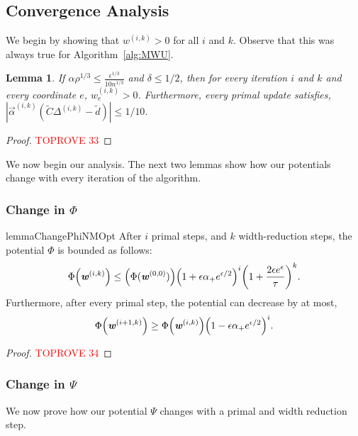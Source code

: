\documentclass[11pt]{article}
\newtheorem{lemma}[theorem]{Lemma}
\let\originalleft\left
\let\originalright\right
\renewcommand{\left}{\mathopen{}\mathclose\bgroup\originalleft}
\renewcommand{\right}{\aftergroup\egroup\originalright}
\newcommand\dd{\boldsymbol{\mathit{d}}}
\newcommand\ww{\boldsymbol{\mathit{w}}}
\newcommand\CC{\boldsymbol{\mathit{C}}}
\newcommand{\wt}{\widetilde}
\begin{document}
\subsection*{Convergence Analysis}
We begin by showing that $\ww^{(i,k)}>0$ for all $i$ and $k$. Observe that this was always true for Algorithm~\ref{alg:MWU}.



\begin{lemma}\label{lem:positiveWopt}
 If $\alpha \rho^{1/3}\leq \frac{\epsilon^{1/3}}{10 n^{1/3}}$ and $\delta \leq 1/2$, then for every iteration $i$ and $k$ and every coordinate $e$, $\ww^{(i,k)}_e > 0$. Furthermore, every primal update satisfies, $|\overrightarrow{\alpha}^{(i,k)} (\wt{\CC}\Delta^{(i,k)}-\wt{\dd})|\leq 1/10.$
\end{lemma}
\begin{proof}\textcolor{red}{TOPROVE 33}\end{proof}

We now begin our analysis. The next two lemmas show how our potentials change with every iteration of the algorithm.

\subsubsection*{Change in $\Phi$}
\begin{restatable}{lemma}{ChangePhiNMOpt}
  \label{lem:ChangePhiNMOpt}
  After $i$ primal steps, and $k$ width-reduction steps,
  the potential $\Phi$ is bounded as follows:
  \begin{align*}
\Phi\left(\ww^{(i,k)}\right) \leq \left(\Phi(\ww^{(0,0)})\right)\left(1+\epsilon\alpha_+ e^{\epsilon/2}\right)^i\left(1 + \frac{2\epsilon e^{\epsilon}}{\tau}\right)^k.
 \end{align*}
 Furthermore, after every primal step, the potential can decrease by at most,
 \[
 \Phi\left(\ww^{(i+1,k)}\right) \geq  \Phi\left(\ww^{(i,k)}\right)\left(1-\epsilon\alpha_+ e^{\epsilon/2}\right)^i.  
 \]
\end{restatable}
\begin{proof}\textcolor{red}{TOPROVE 34}\end{proof}


\subsubsection*{Change in $\Psi$}


We now prove how our potential $\Psi$ changes with a primal and width reduction step.
\end{document}
